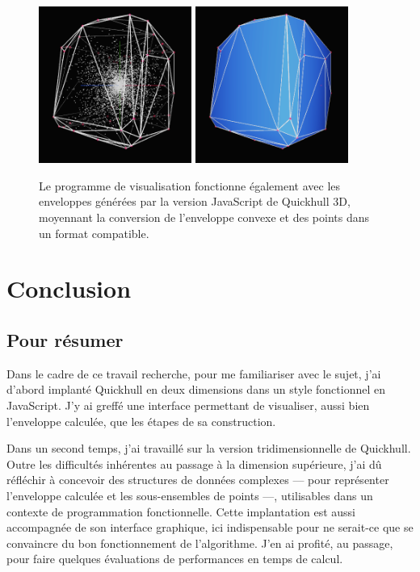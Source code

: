 \documentclass[]{article}
\begin{document}
\begin{figure}[H]
	\begin{center}
		\includegraphics[width=5cm]{illus/illus1.png}
		\includegraphics[width=5cm]{illus/illus2.png}
	\end{center}
	\caption{Le programme de visualisation fonctionne également avec les enveloppes générées par la version JavaScript de Quickhull 3D, moyennant la conversion de l'enveloppe convexe et des points dans un format compatible.}
\end{figure}

\pagebreak
\section{Conclusion}
\subsection{Pour résumer}
Dans le cadre de ce travail recherche, pour me familiariser avec le sujet, j'ai d'abord implanté Quickhull en deux dimensions dans un style fonctionnel en JavaScript. J'y ai greffé une interface permettant de visualiser, aussi bien l'enveloppe calculée, que les étapes de sa construction.

Dans un second temps, j'ai travaillé sur la version tridimensionnelle de Quickhull. Outre les difficultés inhérentes au passage à la dimension supérieure, j'ai dû réfléchir à concevoir des structures de données complexes — pour représenter l'enveloppe calculée et les sous-ensembles de points —, utilisables dans un contexte de programmation fonctionnelle. Cette implantation est aussi accompagnée de son interface graphique, ici indispensable pour ne serait-ce que se convaincre du bon fonctionnement de l'algorithme. J'en ai profité, au passage, pour faire quelques évaluations de performances en temps de calcul.
\end{document}
